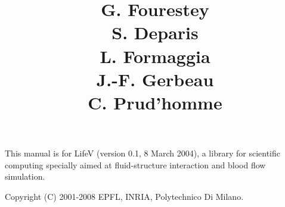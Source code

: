 \documentclass[a4paper,report]{lifestyle}
\title{\lifetitle{LifeV Developer Manual}
{G. Fourestey \\  S. Deparis \\ L. Formaggia \\ J.-F. Gerbeau \\ C. Prud'homme }
}
\begin{document}
\maketitle


\phantom{dummy text}
\vfill
This manual is for LifeV (version 0.1, 8 March 2004), a library for scientific computing specially aimed at fluid-structure interaction and blood flow simulation.

Copyright (C) 2001-2008 EPFL, INRIA, Polytechnico Di Milano.

\tableofcontents

\listoffigures

\listoftables

%
%







\printindex
\end{document}
